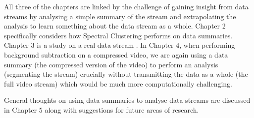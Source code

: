 
All three of the chapters are linked by the challenge of gaining insight from data streams by analysing a simple summary of the stream and extrapolating the analysis to learn something about the data stream as a whole. Chapter 2 specifically considers how Spectral Clustering performs on data summaries. Chapter 3 is a study on a real data stream . In Chapter 4, when performing background subtraction on a compressed video, we are again using a data summary (the compressed version of the video) to perform an analysis (segmenting the stream) crucially without transmitting the data as a whole (the full video stream) which would be much more computationally challenging. 

General thoughts on using data summaries to analyse data streams are discussed in Chapter 5 along with suggestions for future areas of research.

